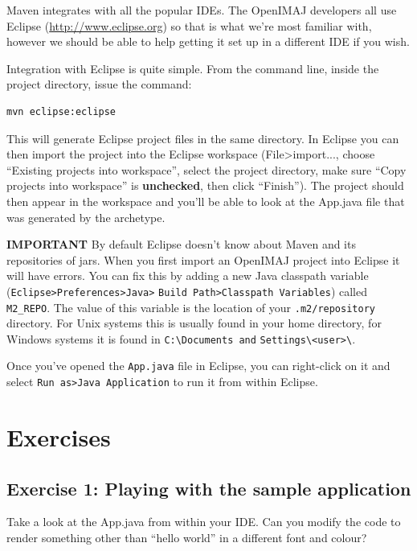 Maven integrates with all the popular IDEs. The OpenIMAJ developers all use Eclipse 
(\url{http://www.eclipse.org}) so that is what we're most familiar with, however we should be able 
to help getting it set up in a different IDE if you wish. 

Integration with Eclipse is quite simple. From the command line, inside the project directory, 
issue the command:
\begin{lstlisting}[language=bash]
mvn eclipse:eclipse
\end{lstlisting}
This will generate Eclipse project files in the same directory. In Eclipse you can then import 
the project into the Eclipse workspace (File>import..., choose ``Existing projects into workspace'', 
select the project directory, make sure ``Copy projects into workspace'' is \textbf{unchecked}, then click
 ``Finish''). The project should then appear in the workspace and you'll be able to look at the 
App.java file that was generated by the archetype.

\textbf{IMPORTANT} By default Eclipse doesn't know about Maven and its repositories of jars. When you 
first import an OpenIMAJ project into Eclipse it will have errors. You can fix this by adding 
a new Java classpath variable (\verb+Eclipse>Preferences>Java>+ \verb+Build Path>Classpath Variables+) 
called \verb+M2_REPO+. The value of this variable is the location of your \verb+.m2/repository+ directory. 
For Unix systems this is usually found in your home directory, for Windows systems it is found 
in \verb+C:\Documents and+ \verb+Settings\<user>\+.

Once you've opened the \verb+App.java+ file in Eclipse, you can right-click on it and select 
\verb+Run as>Java Application+ to run it from within Eclipse. 

\section*{Exercises}
\subsection{Exercise 1: Playing with the sample application}
Take a look at the App.java from within your IDE. Can you modify the code to render something 
other than ``hello world'' in a different font and colour?
